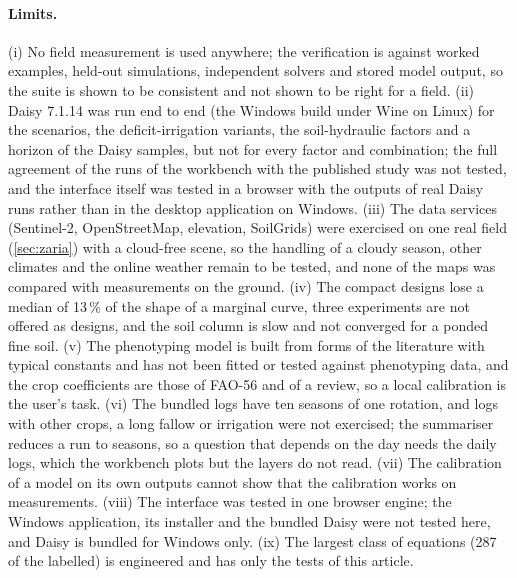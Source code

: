 \paragraph{Limits.} (i) No field measurement is used anywhere; the verification is against worked examples, held-out simulations, independent solvers and stored model output, so the suite is shown to be consistent and not shown to be right for a field. (ii) Daisy 7.1.14 was run end to end (the Windows build under Wine on Linux) for the scenarios, the deficit-irrigation variants, the soil-hydraulic factors and a horizon of the Daisy samples, but not for every factor and combination; the full agreement of the runs of the workbench with the published study was not tested, and the interface itself was tested in a browser with the outputs of real Daisy runs rather than in the desktop application on Windows. (iii) The data services (Sentinel-2, OpenStreetMap, elevation, SoilGrids) were exercised on one real field (\cref{sec:zaria}) with a cloud-free scene, so the handling of a cloudy season, other climates and the online weather remain to be tested, and none of the maps was compared with measurements on the ground. (iv) The compact designs lose a median of 13\,\% of the shape of a marginal curve, three experiments are not offered as designs, and the soil column is slow and not converged for a ponded fine soil. (v) The phenotyping model is built from forms of the literature with typical constants and has not been fitted or tested against phenotyping data, and the crop coefficients are those of FAO-56 and of a review, so a local calibration is the user's task. (vi) The bundled logs have ten seasons of one rotation, and logs with other crops, a long fallow or irrigation were not exercised; the summariser reduces a run to seasons, so a question that depends on the day needs the daily logs, which the workbench plots but the layers do not read. (vii) The calibration of a model on its own outputs cannot show that the calibration works on measurements. (viii) The interface was tested in one browser engine; the Windows application, its installer and the bundled Daisy were not tested here, and Daisy is bundled for Windows only. (ix) The largest class of equations (287 of the labelled) is engineered and has only the tests of this article.

